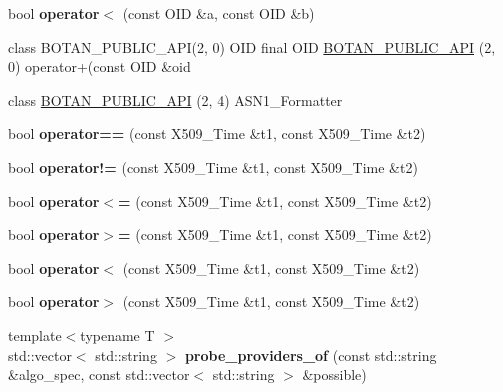 \begin{DoxyCompactItemize}
bool {\bfseries operator$<$} (const O\+ID \&a, const O\+ID \&b)
\item 
class B\+O\+T\+A\+N\+\_\+\+P\+U\+B\+L\+I\+C\+\_\+\+A\+PI(2, 0) O\+ID final O\+ID \mbox{\hyperlink{namespace_botan_aa0df5a86f85160d4d4b3cfdb3fe37b55}{B\+O\+T\+A\+N\+\_\+\+P\+U\+B\+L\+I\+C\+\_\+\+A\+PI}} (2, 0) operator+(const O\+ID \&oid
\item 
class \mbox{\hyperlink{namespace_botan_a306d82593a051b515b926e213e8040f2}{B\+O\+T\+A\+N\+\_\+\+P\+U\+B\+L\+I\+C\+\_\+\+A\+PI}} (2, 4) A\+S\+N1\+\_\+\+Formatter
\item 
\mbox{\label{namespace_botan_afb4b43fcc4133692ad6928db2b415566}} 
bool {\bfseries operator==} (const X509\+\_\+\+Time \&t1, const X509\+\_\+\+Time \&t2)
\item 
\mbox{\label{namespace_botan_a0ff323a3542d27167ba9c00743fad212}} 
bool {\bfseries operator!=} (const X509\+\_\+\+Time \&t1, const X509\+\_\+\+Time \&t2)
\item 
\mbox{\label{namespace_botan_a5e2d002845cc77dc8a5f963cdd2b5a12}} 
bool {\bfseries operator$<$=} (const X509\+\_\+\+Time \&t1, const X509\+\_\+\+Time \&t2)
\item 
\mbox{\label{namespace_botan_a7b9975acda25a0cd4318c48c517fda27}} 
bool {\bfseries operator$>$=} (const X509\+\_\+\+Time \&t1, const X509\+\_\+\+Time \&t2)
\item 
\mbox{\label{namespace_botan_a3031a14cc3964a29e8f70c877bd8adad}} 
bool {\bfseries operator$<$} (const X509\+\_\+\+Time \&t1, const X509\+\_\+\+Time \&t2)
\item 
\mbox{\label{namespace_botan_a2d7d7146cb3792c80bbaf1760ced589e}} 
bool {\bfseries operator$>$} (const X509\+\_\+\+Time \&t1, const X509\+\_\+\+Time \&t2)
\item 
\mbox{\label{namespace_botan_a2c8ae79f2e15f3ed4a57feabd42c6b9a}} 
{\footnotesize template$<$typename T $>$ }\\std\+::vector$<$ std\+::string $>$ {\bfseries probe\+\_\+providers\+\_\+of} (const std\+::string \&algo\+\_\+spec, const std\+::vector$<$ std\+::string $>$ \&possible)
\item 

\end{DoxyCompactItemize}
